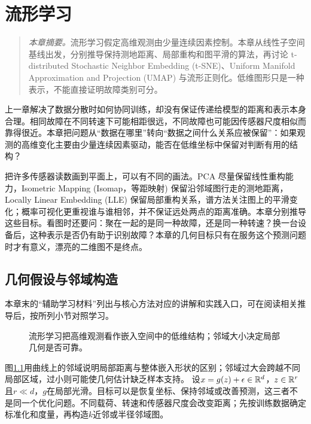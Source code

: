 \chapter{流形学习}
\label{chap:manifold}
\begin{quote}\small
\textit{本章摘要。}流形学习假定高维观测由少量连续因素控制。本章从线性子空间基线出发，分别推导保持测地距离、局部重构和图平滑的算法，再讨论 t-distributed Stochastic Neighbor Embedding (t-SNE)、Uniform Manifold Approximation and Projection (UMAP) 与流形正则化。低维图形只是一种表示，不能直接证明故障类别可分。
\end{quote}

上一章解决了数据分散时如何协同训练，却没有保证传递给模型的距离和表示本身合理。相同故障在不同转速下可能相距很远，不同故障也可能因传感器尺度相似而靠得很近。本章把问题从“数据在哪里”转向“数据之间什么关系应被保留”：如果观测的高维变化主要由少量连续因素驱动，能否在低维坐标中保留对判断有用的结构？

把许多传感器读数画到平面上，可以有不同的画法。PCA 尽量保留线性重构能力，Isometric Mapping (Isomap，等距映射) 保留沿邻域图行走的测地距离，Locally Linear Embedding (LLE) 保留局部重构关系，谱方法关注图上的平滑变化；概率可视化更重视谁与谁相邻，并不保证远处两点的距离准确。本章分别推导这些目标。看图时还要问：聚在一起的是同一种故障，还是同一种转速？换一台设备后，这种表示是否仍有助于识别故障？本章的几何目标只有在服务这个预测问题时才有意义，漂亮的二维图不是终点。

\section{几何假设与邻域构造}

本章末的“辅助学习材料”列出与核心方法对应的讲解和实践入口，可在阅读相关推导后，按所列小节对照学习。

\begin{figure}[htbp]
\centering
{}
\caption{流形学习把高维观测看作嵌入空间中的低维结构；邻域大小决定局部几何是否可靠。}
\label{fig:manifold-local-geometry}
\end{figure}
图\ref{fig:manifold-local-geometry}用曲线上的邻域说明局部距离与整体嵌入形状的区别；邻域过大会跨越不同局部区域，过小则可能使几何估计缺乏样本支持。
设$x=g(z)+\epsilon\in\mathbb{R}^d$，$z\in\mathbb{R}^r$且$r\ll d$，$g$在局部光滑。目标可以是恢复坐标、保持邻域或改善预测，这三者不是同一个优化问题。不同载荷、转速和传感器尺度会改变距离；先按训练数据确定标准化和度量，再构造$k$近邻或半径邻域图。

